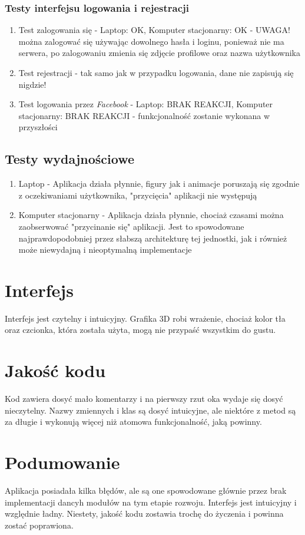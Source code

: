 \documentclass[12pt]{article}
\begin{document}
\subsubsection{Testy interfejsu logowania i rejestracji}
\begin{enumerate}
\item Test zalogowania się - Laptop: OK, Komputer stacjonarny: OK - UWAGA! można zalogować się używając dowolnego hasła i loginu, ponieważ nie ma serwera, po zalogowaniu zmienia się zdjęcie profilowe oraz nazwa użytkownika
\item Test rejestracji - tak samo jak w przypadku logowania, dane nie zapisują się nigdzie!
\item Test logowania przez \textit{Facebook} - Laptop: BRAK REAKCJI, Komputer stacjonarny: BRAK REAKCJI - funkcjonalność zostanie wykonana w przyszłości
\end{enumerate}
\subsection{Testy wydajnościowe}
\begin{enumerate}
\item Laptop - Aplikacja działa płynnie, figury jak i animacje poruszają się zgodnie z oczekiwaniami użytkownika, "przycięcia" aplikacji nie występują
\item Komputer stacjonarny - Aplikacja działa płynnie, chociaż czasami można zaobserwować "przycinanie się" aplikacji. Jest to spowodowane najprawdopodobniej przez słabszą architekturę tej jednostki, jak i również może niewydajną i nieoptymalną implementacje
\end{enumerate}
\section{Interfejs}
Interfejs jest czytelny i intuicyjny. Grafika 3D robi wrażenie, chociaż kolor tła oraz czcionka, która została użyta, mogą nie przypaść wszystkim do gustu.
\section{Jakość kodu}
Kod zawiera dosyć mało komentarzy i na pierwszy rzut oka wydaje się dosyć nieczytelny. Nazwy zmiennych i klas są dosyć intuicyjne, ale niektóre z metod są za długie i wykonują więcej niż atomowa funkcjonalność, jaką powinny.

\section{Podumowanie}
Aplikacja posiadała kilka błędów, ale są one spowodowane głównie przez brak implementacji dancyh modułów na tym etapie rozwoju. Interfejs jest intuicyjny i względnie ładny. Niestety, jakość kodu zostawia trochę do życzenia i powinna zostać poprawiona. 
\end{document}
